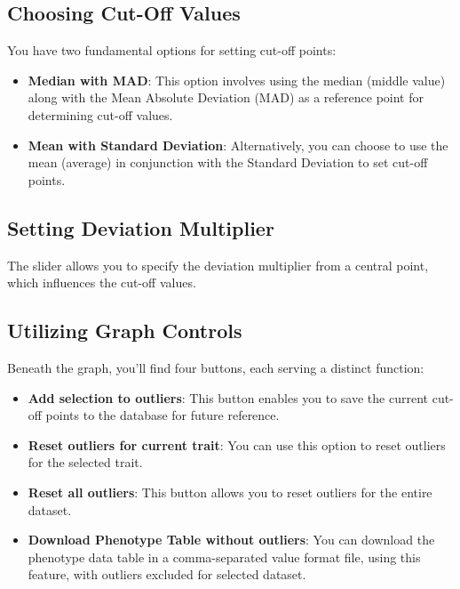 \documentclass[
  12pt,
]{book}
\providecommand{\tightlist}{%
  \setlength{\itemsep}{0pt}\setlength{\parskip}{0pt}}
\begin{document}
\hypertarget{choosing-cut-off-values}{%
\subsection{Choosing Cut-Off Values}\label{choosing-cut-off-values}}

You have two fundamental options for setting cut-off points:

\begin{itemize}
\tightlist
\item
  \textbf{Median with MAD}: This option involves using the median (middle value) along with the Mean Absolute Deviation (MAD) as a reference point for determining cut-off values.
\item
  \textbf{Mean with Standard Deviation}: Alternatively, you can choose to use the mean (average) in conjunction with the Standard Deviation to set cut-off points.
\end{itemize}

\hypertarget{setting-deviation-multiplier}{%
\subsection{Setting Deviation Multiplier}\label{setting-deviation-multiplier}}

The slider allows you to specify the deviation multiplier from a central point, which influences the cut-off values.

\hypertarget{utilizing-graph-controls}{%
\subsection{Utilizing Graph Controls}\label{utilizing-graph-controls}}

Beneath the graph, you'll find four buttons, each serving a distinct function:

\begin{itemize}
\tightlist
\item
  \textbf{Add selection to outliers}: This button enables you to save the current cut-off points to the database for future reference.
\item
  \textbf{Reset outliers for current trait}: You can use this option to reset outliers for the selected trait.
\item
  \textbf{Reset all outliers}: This button allows you to reset outliers for the entire dataset.
\item
  \textbf{Download Phenotype Table without outliers}: You can download the phenotype data table in a comma-separated value format file, using this feature, with outliers excluded for selected dataset.
\end{itemize}
\end{document}
